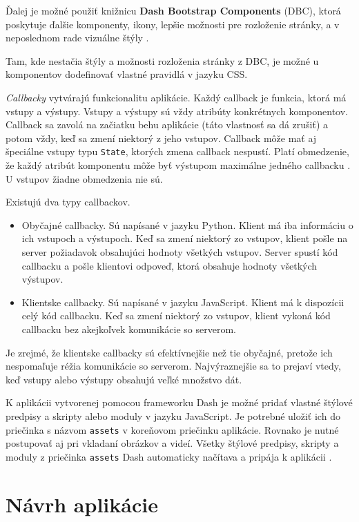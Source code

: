 Ďalej je možné použiť knižnicu \textbf{Dash Bootstrap Components} (DBC), ktorá poskytuje ďalšie komponenty, ikony, lepšie možnosti pre rozloženie stránky, a v neposlednom rade vizuálne štýly \cite{dbc_documentation}.

Tam, kde nestačia štýly a možnosti rozloženia stránky z DBC, je možné u komponentov dodefinovať vlastné pravidlá v jazyku CSS.

\emph{Callbacky} vytvárajú funkcionalitu aplikácie. Každý callback je funkcia, ktorá má vstupy a výstupy. Vstupy a výstupy sú vždy atribúty konkrétnych komponentov. Callback sa zavolá na začiatku behu aplikácie (táto vlastnosť sa dá zrušiť) a potom vždy, keď sa zmení niektorý z jeho vstupov. Callback môže mať aj špeciálne vstupy typu \texttt{State}, ktorých zmena callback nespustí. Platí obmedzenie, že každý atribút komponentu môže byť výstupom maximálne jedného callbacku \cite{dash_documentation}. U vstupov žiadne obmedzenia nie sú.

Existujú dva typy callbackov.
\begin{itemize}
    \item Obyčajné callbacky. Sú napísané v jazyku Python. Klient má iba informáciu o ich vstupoch a výstupoch. Keď sa zmení niektorý zo vstupov, klient pošle na server požiadavok obsahujúci hodnoty všetkých vstupov. Server spustí kód callbacku a pošle klientovi odpoveď, ktorá obsahuje hodnoty všetkých výstupov.
    \item Klientske callbacky. Sú napísané v jazyku JavaScript. Klient má k dispozícii celý kód callbacku. Keď sa zmení niektorý zo vstupov, klient vykoná kód callbacku bez akejkoľvek komunikácie so serverom.
\end{itemize}

Je zrejmé, že klientske callbacky sú efektívnejšie než tie obyčajné, pretože ich nespomaľuje réžia komunikácie so serverom. Najvýraznejšie sa to prejaví vtedy, keď vstupy alebo výstupy obsahujú veľké množstvo dát.

K aplikácii vytvorenej pomocou frameworku Dash je možné pridať vlastné štýlové predpisy a skripty alebo moduly v jazyku JavaScript. Je potrebné uložiť ich do priečinka s názvom \texttt{assets} v koreňovom priečinku aplikácie. Rovnako je nutné postupovať aj pri vkladaní obrázkov a videí. Všetky štýlové predpisy, skripty a moduly z priečinka \texttt{assets} Dash automaticky načítava a pripája k aplikácii \cite{dash_documentation}.

\chapter{Návrh aplikácie}

